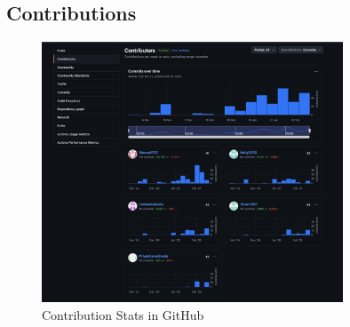 \documentclass{llncs}
\begin{document}
\subsection{Contributions}
\begin{figure}[htbp]
    \centering
    \includegraphics[width=0.8\textwidth]{../images/contributions.png}
    \vspace{0.01\textwidth}
    \caption{Contribution Stats in GitHub}
    \label{fig:contributions}
\end{figure}

\vphantom{}\\
\end{document}
